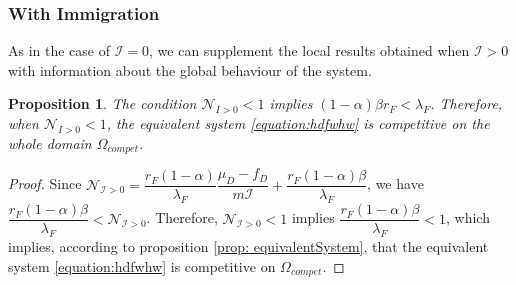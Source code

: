 \documentclass{article}
\newcommand{\lfw}{\lambda_{F}}
\newcommand{\lfw}{\lambda_{F}}
\newcommand{\cI}{\mathcal{I}}
\newtheorem{prop}[theorem]{Proposition}
\theoremstyle{definition}
\theoremstyle{remark}
\begin{document}
\subsubsection{With Immigration}

As in the case of $\cI = 0$, we can supplement the local results obtained when $\cI > 0$ with information about the global behaviour of the system. 

\begin{prop}
The condition $\mathcal{N}_{I > 0} < 1$ implies $(1-\alpha) \beta r_F < \lfw$. Therefore, when $\mathcal{N}_{I > 0} < 1$, the equivalent system \eqref{equation:hdfwhw} is competitive on the whole domain $\Omega_{compet}$.
\end{prop}

\begin{proof}
Since $\mathcal{N}_{\cI > 0} = \dfrac{r_F(1-\alpha)}{\lfw}\dfrac{\mu_D - f_D}{m \cI} + \dfrac{r_F(1-\alpha) \beta}{\lfw}$, we have $\dfrac{r_F(1-\alpha) \beta}{\lfw} < \mathcal{N}_{\cI > 0}$. Therefore, $\mathcal{N}_{\cI > 0} < 1$ implies $\dfrac{r_F(1-\alpha) \beta}{\lfw} < 1$, which implies, according to proposition \ref{prop: equivalentSystem}, that the equivalent system \eqref{equation:hdfwhw} is competitive on $\Omega_{compet}$.
\end{proof}
\end{document}
